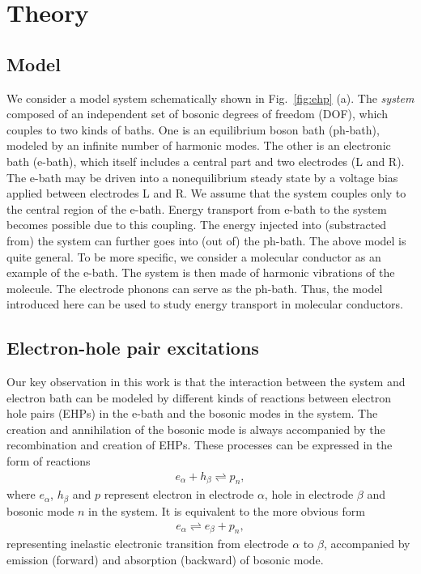 \documentclass[aps
,floatfix,footinbib,
preprint
]{revtex4-1}
\begin{document}
\section{Theory}
\subsection{Model}
We consider a model system schematically shown in Fig.~\ref{fig:ehp} (a). The \emph{system} composed of an independent set of bosonic degrees of freedom (DOF), which couples to two kinds of baths. One is an equilibrium boson bath (ph-bath), modeled by an infinite number of harmonic modes. The other is an electronic bath (e-bath), which itself includes a central part and two electrodes (L and R).  The e-bath may be driven into a nonequilibrium steady state by a voltage bias applied between electrodes L and R. We assume that the system couples only to the central region of the e-bath. Energy transport from e-bath to the system becomes possible due to this coupling. The energy injected into (substracted from) the system can further goes into (out of) the ph-bath. The above model is quite general. To be more specific, we consider a molecular conductor as an example of the e-bath. The system is then made of harmonic vibrations of the molecule. The electrode phonons can serve as the ph-bath. Thus, the model introduced here can be used to study energy transport in molecular conductors\cite{lu2007coupled,lu2011laserlike,lu2016electron}.



\subsection{Electron-hole pair excitations}
Our key observation in this work is that the interaction between the system and electron bath can be modeled by different kinds of reactions between electron hole pairs (EHPs)  in the e-bath and the bosonic modes in the system. The creation and annihilation of the bosonic mode is always accompanied by the recombination and creation of EHPs. These processes can be expressed in the form of reactions
\begin{align}
e_\alpha + h_\beta \rightleftharpoons p_n,
\label{eq:reaction}
\end{align}
where $e_\alpha$, $h_\beta$ and $p$ represent electron in electrode $\alpha$, hole in electrode $\beta$ and bosonic mode $n$ in the system. It is equivalent to the more obvious form
\begin{align}
e_\alpha \rightleftharpoons e_\beta + p_n,
\label{eq:reaction2}
\end{align}
representing inelastic electronic transition from electrode $\alpha$ to $\beta$, accompanied by emission (forward) and absorption (backward) of bosonic mode.
\end{document}
